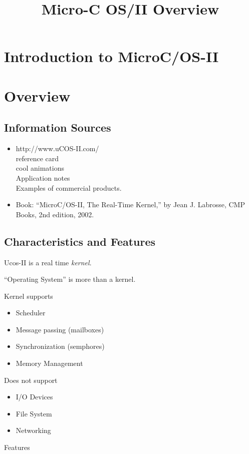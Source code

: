 \documentclass{article}	%
\title{Micro-C OS/II Overview}
\begin{document}



\section*{Introduction to MicroC/OS-II  }
\section{Overview}
\subsection{Information Sources }
\begin{itemize}
\item http://www.uCOS-II.com/ \\
reference card\\
cool animations \\
Application notes \\
Examples of commercial products.
\item Book: ``MicroC/OS-II, The Real-Time Kernel,'' by
Jean J. Labrosse, CMP Books, 2nd edition, 2002.
\end{itemize}



\subsection{Characteristics and Features}

Ucos-II is a real time {\it kernel}.

``Operating System'' is more than a kernel.

Kernel supports
\begin{itemize}
  \item Scheduler
  \item Message passing (mailboxes)
  \item Synchronization (semphores)
  \item Memory Management
\end{itemize}

Does not support
\begin{itemize}
  \item I/O Devices
  \item File System
  \item Networking
\end{itemize}

Features
\end{document}
